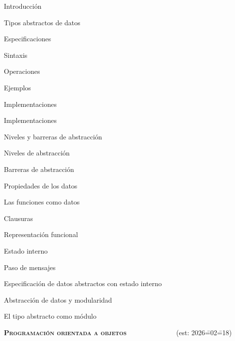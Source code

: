 \begin{longenum}
\begin{longenum}
\begin{longenum}
            \item Introducción
            \item Tipos abstractos de datos
        \end{longenum}
        \item Especificaciones
        \begin{longenum}
            \item Sintaxis
            \item Operaciones
            \item Ejemplos
        \end{longenum}
        \item Implementaciones
        \begin{longenum}
            \item Implementaciones
        \end{longenum}
        \item Niveles y barreras de abstracción
        \begin{longenum}
            \item Niveles de abstracción
            \item Barreras de abstracción
            \item Propiedades de los datos
        \end{longenum}
        \item Las funciones como datos
        \begin{longenum}
            \item Clausuras
            \item Representación funcional
            \item Estado interno
            \item Paso de mensajes
            \item Especificación de datos abstractos con estado interno
        \end{longenum}
        \item Abstracción de datos y modularidad
        \begin{longenum}
            \item El tipo abstracto como módulo
        \end{longenum}
    \end{longenum}
    \item \textbf{\textsc{Programación orientada a objetos}} \ \ \ \ \ \ \ \ \ \ \ \ \ \ (est: 2026\==02\==18)
    \begin{longenum}

\end{longenum}
\end{longenum}

